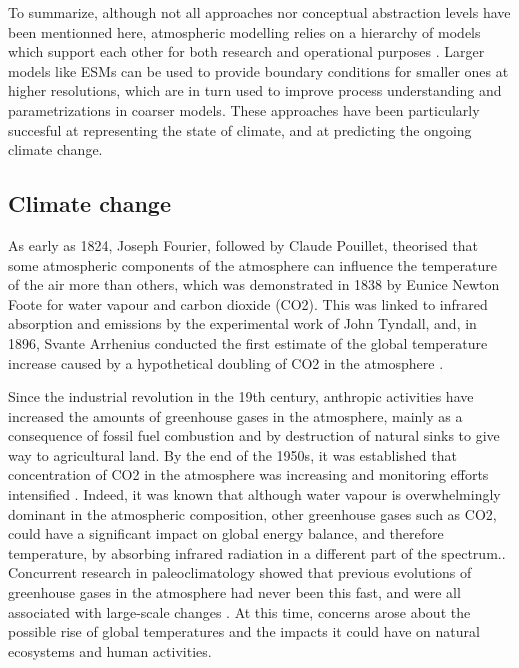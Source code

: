 To summarize, although not all approaches nor conceptual abstraction levels have been mentionned here, atmospheric modelling relies on a hierarchy of models which support each other for both research and operational purposes \citep{maher_model_2019}. Larger models like ESMs can be used to provide boundary conditions for smaller ones at higher resolutions, which are in turn used to improve process understanding and parametrizations in coarser models.
These approaches have been particularly succesful at representing the state of climate, and at predicting the ongoing climate change.

\subsection{Climate change}
As early as 1824, Joseph Fourier, followed by Claude Pouillet, theorised that some atmospheric components of the atmosphere can influence the temperature of the air more than others, which was demonstrated in 1838 by Eunice Newton Foote for water vapour and carbon dioxide (CO2). This was linked to infrared absorption and emissions by the experimental work of John Tyndall, and, in 1896, Svante Arrhenius conducted the first estimate of the global temperature increase caused by a hypothetical doubling of CO2 in the atmosphere \citep{frs_xxiii_1861,arrhenius_xxxi_1896}.

Since the industrial revolution in the 19th century, anthropic activities have increased the amounts of greenhouse gases in the atmosphere, mainly as a consequence of fossil fuel combustion and by destruction of natural sinks to give way to agricultural land.
By the end of the 1950s, it was established that concentration of CO2 in the atmosphere was increasing and monitoring efforts intensified \citep{pales_concentration_1965}.
Indeed, it was known that although water vapour is overwhelmingly dominant in the atmospheric composition, other greenhouse gases such as CO2, could have a significant impact on global energy balance, and therefore temperature, by absorbing infrared radiation in a different part of the spectrum.\citep{plass_carbon_2024}.
Concurrent research in paleoclimatology showed that previous evolutions of greenhouse gases in the atmosphere had never been this fast, and were all associated with large-scale changes \citep{lorius_30000-yr_1979}.
At this time, concerns arose about the possible rise of global temperatures and the impacts it could have on natural ecosystems and human activities.\citep{broecker_climatic_1975}

